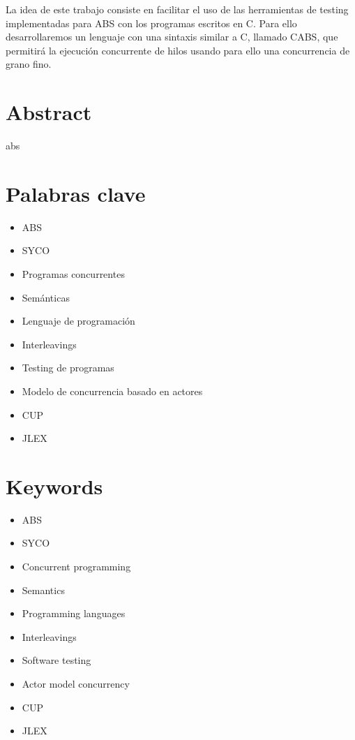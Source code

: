 La idea de este trabajo consiste en facilitar el uso de las herramientas de testing implementadas para ABS con los programas escritos en C. Para ello desarrollaremos un lenguaje con una sintaxis similar a C, llamado CABS, que permitirá la ejecución concurrente de hilos usando para ello una concurrencia de grano fino.

\newpage
\thispagestyle{empty}

\chapter*{Abstract}
\thispagestyle{empty}
abs

\newpage
\thispagestyle{empty}

\chapter*{Palabras clave}
\thispagestyle{empty}
\begin{itemize}
  \item ABS
  \item SYCO
  \item Programas concurrentes
  \item Semánticas
  \item Lenguaje de programación
  \item Interleavings
  \item Testing de programas
  \item Modelo de concurrencia basado en actores
  \item CUP
  \item JLEX
\end{itemize}

\newpage
\thispagestyle{empty}

\chapter*{Keywords}
\thispagestyle{empty}
\begin{itemize}
  \item ABS
  \item SYCO
  \item Concurrent programming
  \item Semantics
  \item Programming languages
  \item Interleavings
  \item Software testing
  \item Actor model concurrency
  \item CUP
  \item JLEX
\end{itemize}

\newpage
\thispagestyle{empty}
